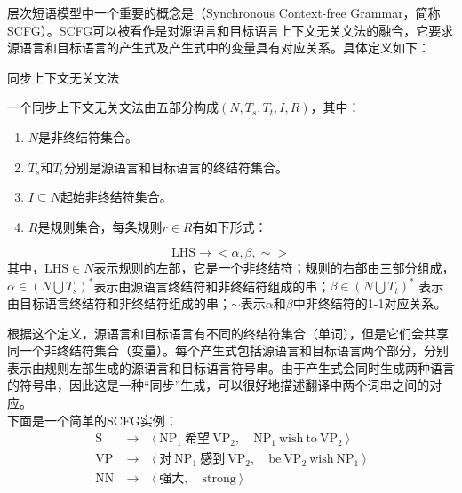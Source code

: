 \parinterval 层次短语模型中一个重要的概念是{\small{}}（Synchronous Context-free Grammar，简称SCFG）。SCFG可以被看作是对源语言和目标语言上下文无关文法的融合，它要求源语言和目标语言的产生式及产生式中的变量具有对应关系。具体定义如下：

\vspace{0.5em}
\begin{definition} 同步上下文无关文法

{\small
一个同步上下文无关文法由五部分构成$(N, T_s, T_t, I, R)$，其中：
\begin{enumerate}
\item $N$是非终结符集合。
\item $T_s$和$T_t$分别是源语言和目标语言的终结符集合。
\item $I \subseteq N$起始非终结符集合。
\item $R$是规则集合，每条规则$r \in R$有如下形式：
\end{enumerate}
\begin{displaymath}
\textrm{LHS} \to <\alpha, \beta, \sim>
\end{displaymath}
其中，$\textrm{LHS} \in N$表示规则的左部，它是一个非终结符；规则的右部由三部分组成，$\alpha \in (N \bigcup T_s)^{*}$表示由源语言终结符和非终结符组成的串；$\beta \in (N \bigcup T_t)^{*}$ 表示由目标语言终结符和非终结符组成的串；$\sim$表示$\alpha$和$\beta$中非终结符的1-1对应关系。
}
\end{definition}

\parinterval 根据这个定义，源语言和目标语言有不同的终结符集合（单词），但是它们会共享同一个非终结符集合（变量）。每个产生式包括源语言和目标语言两个部分，分别表示由规则左部生成的源语言和目标语言符号串。由于产生式会同时生成两种语言的符号串，因此这是一种``同步''生成，可以很好地描述翻译中两个词串之间的对应。\\

\parinterval 下面是一个简单的SCFG实例：
\begin{eqnarray}
\textrm{S}\ &\to\ &\langle \ \textrm{NP}_1\ \text{希望}\ \textrm{VP}_2,\quad \textrm{NP}_1\ \textrm{wish}\ \textrm{to}\ \textrm{VP}_2\ \rangle \nonumber \\
\textrm{VP}\ &\to\ &\langle \ \text{对}\ \textrm{NP}_1\ \text{感到}\ \textrm{VP}_2,\quad \textrm{be}\ \textrm{VP}_2\ \textrm{wish}\ \textrm{NP}_1\ \rangle \nonumber \\
\textrm{NN}\ &\to\ &\langle \ \text{强大},\quad \textrm{strong}\ \rangle \nonumber
\end{eqnarray}

